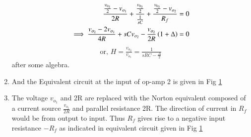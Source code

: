 \begin{enumerate}[label=\arabic*.,ref=\theenumi]
\begin{align}
\frac{\frac{v_{0_2}}{2} - v_{o_1}}{2R} + \frac{\frac{v_{0_2}}{2}}{\frac{1}{sC}} + \frac{\frac{v_{0_2}}{2} - v_{o_2}}{R_{f}} &=0
\\
\implies \frac{v_{o_2} - 2v_{o_1}}{4R} + sCv_{o_2} -  \frac{v_{o_2}}{2R}\left(1 + \Delta\right) &= 0
\end{align}
\begin{align}
\text{or, }    H = \frac{v_{o_2}}{v_{o_1}}= \frac{1}{sRC - \frac{\Delta}{2}}
    \label{eq:es17btech11009_H}
\end{align}
after some algebra.
%

\item
And the Equivalent circuit at the input of op-amp 2 is given in Fig \ref{fig:es17btech11009_fig2}
\renewcommand{\thefigure}{\theenumi.\arabic{figure}}
\begin{figure}[!ht]
	\begin{center}
		\resizebox{\columnwidth}{!}{}
	\end{center}
\caption{}
\label{fig:es17btech11009_fig2}
\end{figure}
\item 
\solution The voltage $v_{o_1}$ and 2R are replaced with the Norton equivalent composed of a current source $\frac{v_{o_1}}{2R}$ and parallel resistance 2R. The direction of current in $R_{f}$ would be from output to input. Thus $R_{f}$ gives rise to a negative input resistance $-R_{f}$ as indicated in equivalent circuit given in Fig \ref{fig:es17btech11009_fig2}


\end{enumerate}
